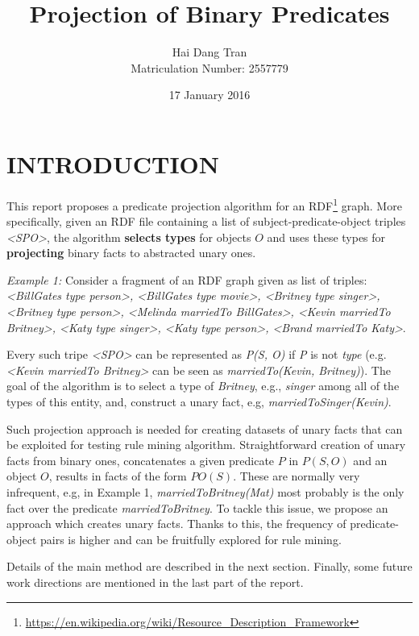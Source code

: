 \documentclass{acm_proc_article-sp}
\begin{document}
\title{Projection of Binary Predicates}
\author{
\alignauthor
Hai Dang Tran\\Matriculation Number: 2557779
}
\date{17 January 2016}

\maketitle

\section{INTRODUCTION}
This report proposes a predicate projection algorithm for an RDF\footnote{\url{https://en.wikipedia.org/wiki/Resource_Description_Framework}} graph. More specifically, given an RDF file containing a list of subject-predicate-object triples \textit{<SPO>}, the algorithm \textbf{selects types} for objects $O$ and uses these types for \textbf{projecting} binary facts to abstracted unary ones.

\textit{Example 1:} Consider a fragment of an RDF graph given as list of triples: \textit{<BillGates type person>, <BillGates type movie>, <Britney type singer>, <Britney type person>, <Melinda marriedTo BillGates>, <Kevin marriedTo Britney>, <Katy type singer>, <Katy type person>, <Brand marriedTo Katy>}.

Every such tripe \textit{<SPO>} can be represented as \textit{P(S, O)} if \textit{P} is not \textit{type} (e.g. \textit{<Kevin marriedTo Britney>} can be seen as \textit{marriedTo(Kevin, Britney)}). The goal of the algorithm is to select a type of \textit{Britney}, e.g., \textit{singer} among all of the types of this entity, and, construct a unary fact, e.g, \textit{marriedToSinger(Kevin)}.

Such projection approach is needed for creating datasets of unary facts that can be exploited for testing rule mining algorithm. Straightforward creation of unary facts from binary ones, concatenates a given predicate $P$ in $P(S, O)$ and an object $O$, results in facts of the form $PO(S)$. These are normally very infrequent, e.g, in Example 1, \textit{marriedToBritney(Mat)} most probably is the only fact over the predicate \textit{marriedToBritney}. To tackle this issue, we propose an approach which creates unary facts. Thanks to this, the frequency of predicate-object pairs is higher and can be fruitfully explored for rule mining.

Details of the main method are described in the next section. Finally, some future work directions are mentioned in the last part of the report.
\end{document}
